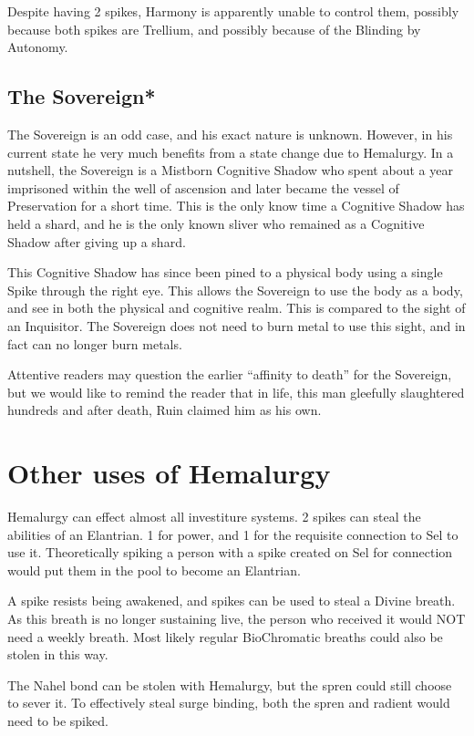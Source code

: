 \documentclass[conference]{IEEEtran}
\newcommand{\n}{\hfill\break}
\begin{document}
Despite having 2 spikes, Harmony is apparently unable to control them, possibly because both spikes are Trellium, and possibly because of the Blinding by Autonomy.

\subsection*{\textbf{The Sovereign}*} The Sovereign is an odd case, and his exact nature is unknown.  However, in his current state he very much benefits from a state change due to Hemalurgy.  In a nutshell, the Sovereign is a Mistborn Cognitive Shadow who spent about a year imprisoned within the well of ascension and later became the vessel of Preservation for a short time.\cite{SH}  This is the only know time a Cognitive Shadow has held a shard, and he is the only known sliver who remained as a Cognitive Shadow after giving up a shard. 

This Cognitive Shadow has since been pined to a physical body using a single Spike through the right eye. This allows the Sovereign to use the body as a body, and see in both the physical and cognitive realm.  This is compared to the sight of an Inquisitor.  The Sovereign does not need to burn metal to use this sight, and in fact can no longer burn metals.\cite{TLM-3WAD} 

Attentive readers may question the earlier ``affinity to death'' for the Sovereign, but we would like to remind the reader that in life, this man gleefully slaughtered hundreds\cite{TFE-CH5} and after death, Ruin claimed him as his own.\cite{SH-PT3-CH3}\n\n
\section{\textbf{Other uses of Hemalurgy}}
Hemalurgy can effect almost all investiture systems.\cite{HE-universal}  2 spikes can steal the abilities of an Elantrian.  1 for power, and 1 for the requisite connection to Sel to use it.\cite{HE-elantrian}  Theoretically spiking a person with a spike created on Sel for connection would put them in the pool to become an Elantrian.\cite{HE-pool}

A spike resists being awakened,\cite{HE-awake} and spikes can be used to steal a Divine breath.\cite{HE-DB}  As this breath is no longer sustaining live, the person who received it would NOT need a weekly breath.\cite{HE-DB-life}  Most likely regular BioChromatic breaths could also be stolen in this way.\cite{PvAvI}

The Nahel bond can be stolen with Hemalurgy, but the spren could still choose to sever it.  To effectively steal surge binding, both the spren and radient would need to be spiked.\cite{HE-Aviar} 
\end{document}
